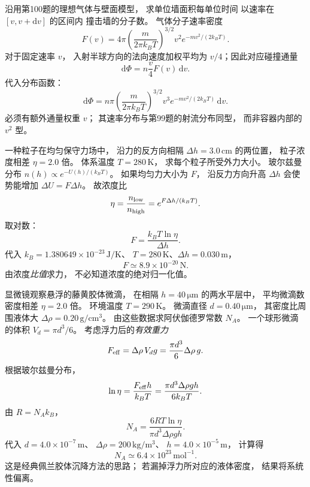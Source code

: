沿用第100题的理想气体与壁面模型，
求单位墙面积每单位时间
以速率在 $[v,v+\mathrm dv]$ 的区间内
撞击墙的分子数。
\exsolution
气体分子速率密度
\[
F(v)=4\pi\left(\frac m{2\pi k_BT}\right)^{3/2}
v^2e^{-mv^2/(2k_BT)}.
\]
对于固定速率 $v$，
入射半球方向的法向速度加权平均为
$v/4$；因此对应碰撞通量
\[
\mathrm d\Phi=
n\frac v4F(v)\,\mathrm dv.
\]
代入分布函数：
\[
\boxed{\mathrm d\Phi=
n\pi\left(\frac m{2\pi k_BT}\right)^{3/2}
v^3e^{-mv^2/(2k_BT)}\,\mathrm dv}.
\]
\excheck 必须有额外通量权重 $v$；
其速率分布与第99题的射流分布同型，
而非容器内部的 $v^2$ 型。

一种粒子在均匀保守力场中，
沿力的反方向相隔
$\Delta h=3.0\,\mathrm{cm}$ 的两位置，
粒子浓度相差
$\eta=2.0$ 倍。
体系温度 $T=280\,\mathrm K$，
求每个粒子所受外力大小。
\exsolution
玻尔兹曼分布
$n(h)\propto e^{-U(h)/(k_BT)}$。
如果均匀力大小为 $F$，
沿反力方向升高 $\Delta h$
会使势能增加
$\Delta U=F\Delta h$。
故浓度比
\[
\eta=\frac{n_{\rm low}}{n_{\rm high}}
=e^{F\Delta h/(k_BT)}.
\]
取对数：
\[
\boxed{F=\frac{k_BT\ln\eta}{\Delta h}}.
\]
代入
$k_B=1.380649\times10^{-23}\,\mathrm{J/K}$、
$T=280\,\mathrm K$、$\Delta h=0.030\,\mathrm m$，
\[
\boxed{F\simeq8.9\times10^{-20}\,\mathrm N}.
\]
\excheck 由浓度\emph{比值}求力，
不必知道浓度的绝对归一化值。

显微镜观察悬浮的藤黄胶体微滴，
在相隔 $h=40\,\mathrm{\mu m}$
的两水平层中，
平均微滴数密度相差 $\eta=2.0$ 倍。
环境温度 $T=290\,\mathrm K$。
微滴直径 $d=0.40\,\mathrm{\mu m}$，
其密度比周围液体大
$\Delta\rho=0.20\,\mathrm{g/cm^3}$。
由这些数据求阿伏伽德罗常数 $N_A$。
\exsolution
一个球形微滴的体积
$V_d=\pi d^3/6$。
考虑浮力后的\emph{有效重力}
\[
F_{\rm eff}=\Delta\rho\,V_d g
=\frac{\pi d^3}{6}\Delta\rho\,g.
\]
根据玻尔兹曼分布，
\[
\ln\eta=\frac{F_{\rm eff}h}{k_BT}
=\frac{\pi d^3\Delta\rho gh}
{6k_BT}.
\]
由 $R=N_Ak_B$，
\[
\boxed{N_A=\frac{6RT\ln\eta}
{\pi d^3\Delta\rho gh}}.
\]
代入
$d=4.0\times10^{-7}\,\mathrm m$、
$\Delta\rho=200\,\mathrm{kg/m^3}$、
$h=4.0\times10^{-5}\,\mathrm m$，
计算得
\[
\boxed{N_A\simeq6.4\times10^{23}\,\mathrm{mol^{-1}}}.
\]
\excheck 这是经典佩兰胶体沉降方法的思路；
若漏掉浮力所对应的液体密度，
结果将系统性偏离。
